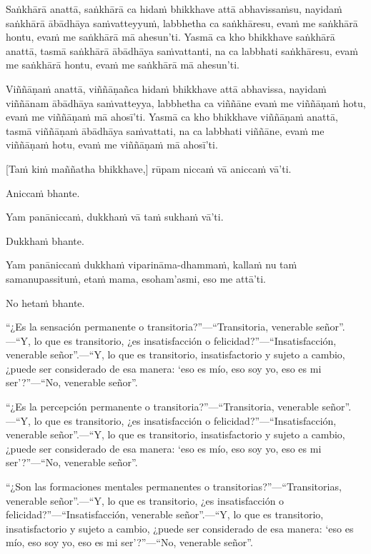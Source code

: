 Saṅkhārā anattā, saṅkhārā ca hidaṁ bhikkhave attā abhavissaṁsu, nayidaṁ saṅkhārā
ābādhāya saṁvatteyyuṁ, labbhetha ca saṅkhāresu, evaṁ me saṅkhārā hontu, evaṁ me
saṅkhārā mā ahesun'ti. Yasmā ca kho bhikkhave saṅkhārā anattā, tasmā saṅkhārā
ābādhāya saṁvattanti, na ca labbhati saṅkhāresu, evaṁ me saṅkhārā hontu, evaṁ me
saṅkhārā mā ahesun'ti.

Viññāṇaṁ anattā, viññāṇañca hidaṁ bhikkhave attā abhavissa, nayidaṁ viññānam
ābādhāya saṁvatteyya, labbhetha ca viññāne evaṁ me viññāṇaṁ hotu, evaṁ me
viññāṇaṁ mā ahosī'ti. Yasmā ca kho bhikkhave viññāṇaṁ anattā, tasmā viññāṇaṁ
ābādhāya saṁvattati, na ca labbhati viññāne, evaṁ me viññāṇaṁ hotu, evaṁ me
viññāṇaṁ mā ahosī'ti.

[Taṁ kiṁ maññatha bhikkhave,] rūpam niccaṁ vā aniccaṁ vā'ti.

Aniccaṁ bhante.

Yam panāniccaṁ, dukkhaṁ vā taṁ sukhaṁ vā'ti.

Dukkhaṁ bhante.

Yam panāniccaṁ dukkhaṁ viparināma-dhammaṁ, kallaṁ nu taṁ samanupassituṁ,
etaṁ mama, esoham'asmi, eso me attā'ti.

No hetaṁ bhante.

\clearpage

\englishText
\markboth{\englishTitle}{\rightmark}
“¿Es la sensación permanente o transitoria?”—“Transitoria, venerable señor”.—“Y, lo que es transitorio, ¿es insatisfacción o felicidad?”—“Insatisfacción, venerable señor”.—“Y, lo que es transitorio, insatisfactorio y sujeto a cambio, ¿puede ser considerado de esa manera: ‘eso es mío, eso soy yo, eso es mi ser’?”—“No, venerable señor”.

“¿Es la percepción permanente o transitoria?”—“Transitoria, venerable señor”.—“Y, lo que es transitorio, ¿es insatisfacción o felicidad?”—“Insatisfacción, venerable señor”.—“Y, lo que es transitorio, insatisfactorio y sujeto a cambio, ¿puede ser considerado de esa manera: ‘eso es mío, eso soy yo, eso es mi ser’?”—“No, venerable señor”.

“¿Son las formaciones mentales permanentes o transitorias?”—“Transitorias, venerable señor”.—“Y, lo que es transitorio, ¿es insatisfacción o felicidad?”—“Insatisfacción, venerable señor”.—“Y, lo que es transitorio, insatisfactorio y sujeto a cambio, ¿puede ser considerado de esa manera: ‘eso es mío, eso soy yo, eso es mi ser’?”—“No, venerable señor”.



\clearpage

